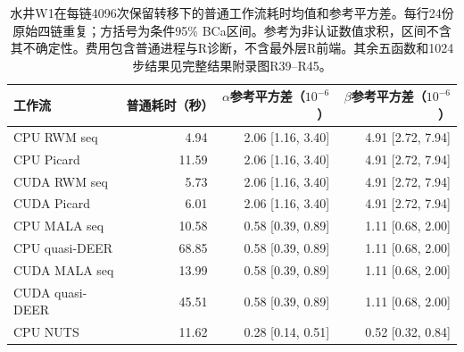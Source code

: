\begin{table}[htbp]\centering\small
\begin{tabular}{lrrr}\toprule
工作流 & 普通耗时（秒） & $\alpha$参考平方差（$10^{-6}$） & $\beta$参考平方差（$10^{-6}$）\\\midrule
CPU RWM seq & 4.94 & 2.06 [1.16, 3.40] & 4.91 [2.72, 7.94]\\
CPU Picard & 11.59 & 2.06 [1.16, 3.40] & 4.91 [2.72, 7.94]\\
CUDA RWM seq & 5.73 & 2.06 [1.16, 3.40] & 4.91 [2.72, 7.94]\\
CUDA Picard & 6.01 & 2.06 [1.16, 3.40] & 4.91 [2.72, 7.94]\\
CPU MALA seq & 10.58 & 0.58 [0.39, 0.89] & 1.11 [0.68, 2.00]\\
CPU quasi-DEER & 68.85 & 0.58 [0.39, 0.89] & 1.11 [0.68, 2.00]\\
CUDA MALA seq & 13.99 & 0.58 [0.39, 0.89] & 1.11 [0.68, 2.00]\\
CUDA quasi-DEER & 45.51 & 0.58 [0.39, 0.89] & 1.11 [0.68, 2.00]\\
CPU NUTS & 11.62 & 0.28 [0.14, 0.51] & 0.52 [0.32, 0.84]\\
\bottomrule\end{tabular}
\caption{水井W1在每链4096次保留转移下的普通工作流耗时均值和参考平方差。每行24份原始四链重复；方括号为条件95\% BCa区间。参考为非认证数值求积，区间不含其不确定性。费用包含普通进程与R诊断，不含最外层R前端。其余五函数和1024步结果见完整结果附录图R39--R45。}
\label{tab:compact-wells}
\end{table}
